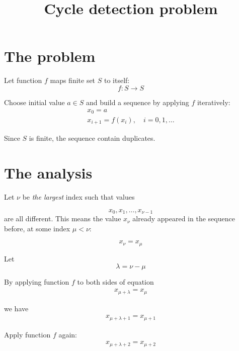 \documentclass[12pt,a4paper]{article}
\begin{document}
\title{Cycle detection problem}
\author{}
\date{}
\maketitle

\section{The problem}

Let function $ f $ maps finite set $ S $ to itself: 
\begin{equation}
f: S \to S
\end{equation}

Choose initial value $ a \in S $ and build a sequence by applying $ f $ iteratively:
\begin{gather}
x_0 = a \\
x_{i+1} = f(x_i), \quad i = 0, 1, \ldots
\end{gather}

Since $ S $ is finite, the sequence contain duplicates.

\section{The analysis}

Let $ \nu $ be \emph{the largest} index such that values

\begin{equation}
x_0, x_1, \ldots, x_{\nu-1}
\end{equation}
are all different. This means the value $ x_{\nu} $ already appeared in the sequence before, at some index $ \mu < \nu $:

\begin{equation}
x_{\nu} = x_{\mu}
\end{equation}

Let
\begin{equation}
\lambda = \nu - \mu
\end{equation}

By applying function $ f $ to both sides of equation
\begin{gather}
x_{\mu + \lambda} = x_{\mu}
\end{gather}

we have
\begin{gather}
x_{\mu + \lambda + 1} = x_{\mu + 1}
\end{gather}

Apply function $ f $ again:
\begin{gather}
x_{\mu + \lambda + 2} = x_{\mu + 2}
\end{gather}
\end{document}
